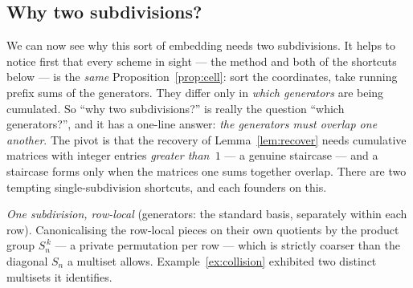 \documentclass[11pt,a4paper]{article}
\theoremstyle{definition}
\theoremstyle{plain}
\newcommand{\Sn}{S_n}
\begin{document}
\subsection{Why two subdivisions?}
\label{sec:whytwo}

We can now see why this sort of embedding needs two subdivisions. It helps to
notice first that every scheme in sight --- the method and both of the
shortcuts below --- is the \emph{same} Proposition~\ref{prop:cell}: sort the
coordinates, take running prefix sums of the generators. They differ only in
\emph{which generators} are being cumulated. So ``why two subdivisions?'' is
really the question ``which generators?'', and it has a one-line answer:
\emph{the generators must overlap one another}. The pivot is that the recovery
of Lemma~\ref{lem:recover} needs cumulative matrices with integer entries
\emph{greater than~$1$} --- a genuine staircase --- and a staircase forms only
when the matrices one sums together overlap. There are two tempting
single-subdivision shortcuts, and each founders on this.

\emph{One subdivision, row-local} (generators: the standard basis, separately
within each row). Canonicalising the row-local pieces on their own quotients by
the product group $\Sn^{\,k}$ --- a private permutation per row --- which is
strictly coarser than the diagonal $\Sn$ a multiset allows.
Example~\ref{ex:collision} exhibited two distinct multisets it identifies.
\end{document}
